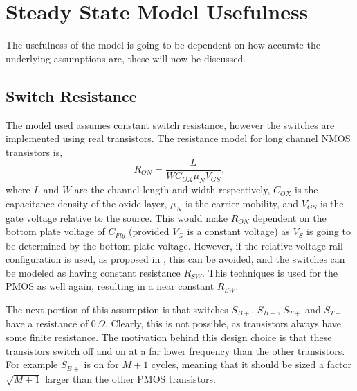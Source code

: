\documentclass[conference]{IEEEtran}
\begin{document}
 	\section{Steady State Model Usefulness}
 	The usefulness of the model is going to be dependent on how accurate the underlying assumptions are, these will now be discussed. 
 	\subsection{Switch Resistance}
 	The model used assumes constant switch resistance, however the switches are implemented using real transistors. The resistance model for long channel NMOS transistors is,
 	\begin{equation}
 	R_{ON} = \frac{L}{WC_{OX}\mu_N V_{GS}},
 	\end{equation}
 	where $L$ and $W$ are the channel length and width respectively, $C_{OX}$ is the capacitance density of the oxide layer, $\mu_N$ is the carrier mobility, and $V_{GS}$ is the gate voltage relative to the source. This would make $R_{ON}$ dependent on the bottom plate voltage of $C_{Fly}$ (provided $V_G$ is a constant voltage) as $V_{S}$ is going to be determined by the bottom plate voltage. However, if the relative voltage rail configuration is used, as proposed in \cite{Butzen2019}, this can be avoided, and the switches can be modeled as having constant resistance $R_{SW}$. This techniques is used for the PMOS as well again, resulting in a near constant $R_{SW}$.
 	
 	The next portion of this assumption is that switches $S_{B+}$, $S_{B-}$, $S_{T+}$ and $S_{T-}$ have a resistance of 0$\,\Omega$. Clearly, this is not possible, as transistors always have some finite resistance. The motivation behind this design choice is that these transistors switch off and on at a far lower frequency than the other transistors. For example $S_{B+}$ is on for $M+1$ cycles, meaning that it should be sized a factor $\sqrt{M+1}$ larger than the other PMOS transistors.
 	
 	
 	
 	
\end{document}
